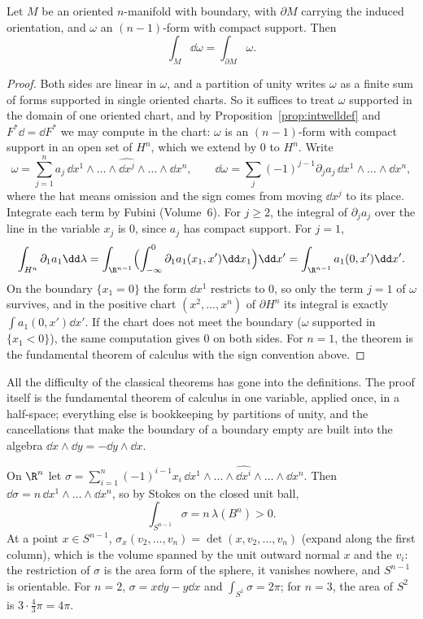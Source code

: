 \begin{theorem}[Stokes]\label{thm:stokes}
Let $M$ be an oriented $n$-manifold with boundary, with $\partial M$ carrying the induced orientation, and $\omega$ an $(n-1)$-form with compact support. Then
\[
\int_M\dd\omega=\int_{\partial M}\omega.
\]
\end{theorem}
\begin{proof}
Both sides are linear in $\omega$, and a partition of unity writes $\omega$ as a finite sum of forms supported in single oriented charts. So it suffices to
treat $\omega$ supported in the domain of one oriented chart, and by Proposition~\ref{prop:intwelldef} and $F^*\dd=\dd F^*$ we may compute in the chart: $\omega$ is an
$(n-1)$-form with compact support in an open set of $H^n$, which we extend by $0$ to $H^n$. Write
\[
\omega=\sum_{j=1}^na_j\,\dd x^1\wedge\dots\wedge\widehat{\dd x^j}\wedge\dots\wedge\dd x^n,\qquad\dd\omega=\sum_j(-1)^{j-1}\partial_ja_j\,\dd x^1\wedge\dots\wedge\dd x^n,
\]
where the hat means omission and the sign comes from moving $\dd x^j$ to its place. Integrate each term by Fubini (Volume~6). For $j\ge2$, the integral of
$\partial_ja_j$ over the line in the variable $x_j$ is $0$, since $a_j$ has compact support. For $j=1$,
\[
\int_{H^n}\partial_1a_1\dd\lambda=\int_{\R^{n-1}}\Bigl(\int_{-\infty}^0\partial_1a_1(x_1,x')\dd x_1\Bigr)\dd x'=\int_{\R^{n-1}}a_1(0,x')\dd x'.
\]
On the boundary $\{x_1=0\}$ the form $\dd x^1$ restricts to $0$, so only the term $j=1$ of $\omega$ survives, and in the positive chart $(x^2,\dots,x^n)$ of $\partial H^n$
its integral is exactly $\int a_1(0,x')\dd x'$. If the chart does not meet the boundary ($\omega$ supported in $\{x_1<0\}$), the same computation gives $0$ on
both sides. For $n=1$, the theorem is the fundamental theorem of calculus with the sign convention above.
\end{proof}

\begin{beauty}
All the difficulty of the classical theorems has gone into the definitions. The proof itself is the fundamental theorem of calculus in one variable,
applied once, in a half-space; everything else is bookkeeping by partitions of unity, and the cancellations that make the boundary of a boundary empty are
built into the algebra $\dd x\wedge\dd y=-\dd y\wedge\dd x$.
\end{beauty}

\begin{example}\label{ex:sigma}
On $\R^n$ let $\sigma=\sum_{i=1}^n(-1)^{i-1}x_i\,\dd x^1\wedge\dots\wedge\widehat{\dd x^i}\wedge\dots\wedge\dd x^n$. Then $\dd\sigma=n\,\dd x^1\wedge\dots\wedge\dd x^n$, so by Stokes on the closed unit
ball,
\[
\int_{S^{n-1}}\sigma=n\,\lambda(B^n)>0.
\]
At a point $x\in S^{n-1}$, $\sigma_x(v_2,\dots,v_n)=\det(x,v_2,\dots,v_n)$ (expand along the first column), which is the volume spanned by the unit outward normal $x$ and
the $v_i$: the restriction of $\sigma$ is the area form of the sphere, it vanishes nowhere, and $S^{n-1}$ is orientable. For $n=2$, $\sigma=x\dd y-y\dd x$ and
$\int_{S^1}\sigma=2\pi$; for $n=3$, the area of $S^2$ is $3\cdot\frac43\pi=4\pi$.
\end{example}

